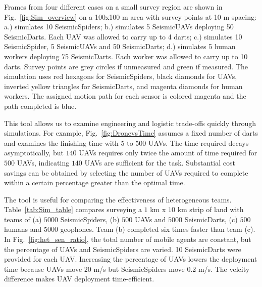 Frames from four different cases on a small survey region are shown in Fig.~\ref{fig:Sim_overview} on a 100x100 m area with survey points at 10 m spacing:
a.) simulates 10 SeismicSpiders;  
b.) simulates 5 SeismicUAVs deploying 50 SeismicDarts.
Each UAV was allowed to carry up to 4 darts;
c.) simulates 10 SeismicSpider, 5 SeismicUAVs and 50 SeismicDarts;
d.) simulates 5 human workers deploying 75 SeismicDarts.
Each worker was allowed to carry up to 10 darts.
Survey points are grey circles if unmeasured and green if measured.
The simulation uses red hexagons for SeismicSpiders,  black diamonds for UAVs,  inverted yellow triangles for SeismicDarts, and magenta diamonds for human workers.
The assigned motion path for each sensor is colored magenta and the path completed is blue.

This tool allows us to examine engineering and logistic trade-offs quickly through simulations.
For example, Fig.~\ref{fig:DronevsTime} assumes a fixed number of darts and examines the finishing time with $5$ to $500$ UAVs.
The time required decays asymptotically, but $140$ UAVs requires only twice the amount of time required for $500$ UAVs, indicating  $140$ UAVs are sufficient for the task.   
 Substantial cost savings can be obtained by selecting the number of UAVs required to complete within a certain percentage greater than the optimal time.

The tool is useful for comparing the effectiveness of heterogeneous teams.
Table~\ref{tab:Sim_table} compares surveying a $1$ km x $10$ km strip of land with teams of (a) $5000$ SeismicSpiders, (b) $500$ UAVs and $5000$ SeismicDarts, (c) $500$ humans and $5000$ geophones.
Team (b) completed six times faster than team (c).
In Fig.~\ref{fig:het_sen_ratio}, the total number of mobile agents are constant, but the percentage of UAVs and SeismicSpiders are varied.
10 SeismicDarts were provided for each UAV.
Increasing the percentage of UAVs lowers the deployment time because UAVs move 20 m/s but SeismicSpiders move 0.2 m/s.
The velcity difference makes UAV deployment time-efficient.
